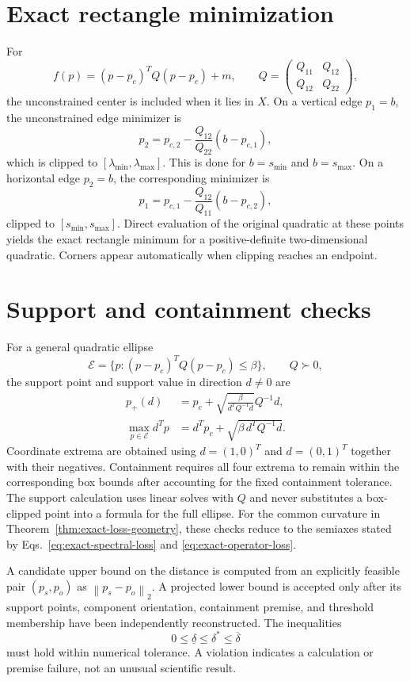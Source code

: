 \documentclass[11pt]{article}
\newcommand{\norm}[1]{\left\lVert #1\right\rVert}
\begin{document}



\appendix

\section{Exact rectangle minimization}

For
\[
 f(p)=(p-p_c)^TQ(p-p_c)+m,
 \qquad
 Q=
 \begin{pmatrix}Q_{11}&Q_{12}\\Q_{12}&Q_{22}\end{pmatrix},
\]
the unconstrained center is included when it lies in $X$. On a vertical edge $p_1=b$,
the unconstrained edge minimizer is
\[
 p_2=p_{c,2}-\frac{Q_{12}}{Q_{22}}(b-p_{c,1}),
\]
which is clipped to $[\lambda_{\min},\lambda_{\max}]$. This is done for
$b=s_{\min}$ and $b=s_{\max}$. On a horizontal edge $p_2=b$, the corresponding minimizer
is
\[
 p_1=p_{c,1}-\frac{Q_{12}}{Q_{11}}(b-p_{c,2}),
\]
clipped to $[s_{\min},s_{\max}]$. Direct evaluation of the original quadratic at these
points yields the exact rectangle minimum for a positive-definite two-dimensional
quadratic. Corners appear automatically when clipping reaches an endpoint.

\section{Support and containment checks}

For a general quadratic ellipse
\[
 \mathcal E=\{p:(p-p_c)^TQ(p-p_c)\le\beta\},
 \qquad Q\succ0,
\]
the support point and support value in direction $d\ne0$ are
\begin{align}
 p_+(d)&=p_c+
 \sqrt{\frac{\beta}{d^TQ^{-1}d}}Q^{-1}d,\\
 \max_{p\in\mathcal E}d^Tp
 &=d^Tp_c+\sqrt{\beta\,d^TQ^{-1}d}.
\end{align}
Coordinate extrema are obtained using $d=(1,0)^T$ and $d=(0,1)^T$ together with their
negatives. Containment requires all four extrema to remain within the corresponding box
bounds after accounting for the fixed containment tolerance. The support calculation
uses linear solves with $Q$ and never substitutes a box-clipped point into a formula for
the full ellipse. For the common curvature in
Theorem~\ref{thm:exact-loss-geometry}, these checks reduce to the semiaxes stated by
Eqs.~\eqref{eq:exact-spectral-loss} and \eqref{eq:exact-operator-loss}.

A candidate upper bound on the distance is computed from an explicitly feasible pair
$(p_s,p_o)$ as $\norm{p_s-p_o}_2$. A projected lower bound is accepted only after its
support points, component orientation, containment premise, and threshold membership
have been independently reconstructed. The inequalities
\[
 0\le\underline\delta\le\delta^*\le\overline\delta
\]
must hold within numerical tolerance. A violation indicates a calculation or premise
failure, not an unusual scientific result.
\end{document}
